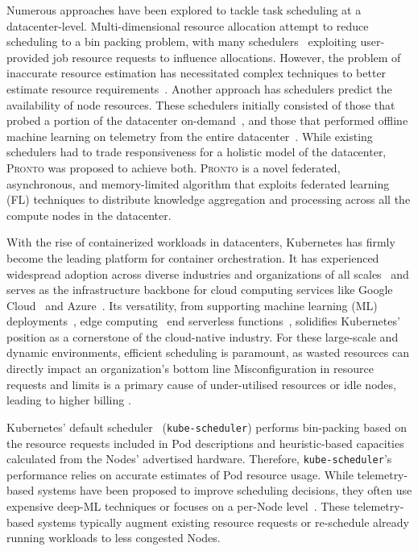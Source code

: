 Numerous approaches have been explored to tackle task scheduling at a
datacenter-level. Multi-dimensional resource allocation attempt to reduce
scheduling to a bin packing problem, with many schedulers~\cite{verma2015large,
ungureanu2019kubernetes}
exploiting user-provided job resource requests to influence allocations.
However, the problem of inaccurate resource estimation has necessitated complex
techniques to better estimate resource requirements~\cite{delimitrou2014quasar, grandl2016altruistic, venkataraman2016ernest}. Another approach
has schedulers predict the availability of node resources. These schedulers
initially consisted of those that probed a portion of the datacenter
on-demand~\cite{ousterhout2013sparrow}, and those that performed offline machine learning on
telemetry from the entire datacenter~\cite{cortez2017resource}. While existing schedulers had to
trade responsiveness for a holistic model of the datacenter, \textsc{Pronto} was
proposed to achieve both. \textsc{Pronto} is a novel federated, asynchronous,
and memory-limited algorithm that exploits federated learning (FL) techniques to
distribute knowledge aggregation and processing across all the compute nodes in
the datacenter.

With the rise of containerized workloads in datacenters, Kubernetes has firmly
become the leading platform for container orchestration. It has experienced
widespread adoption across diverse industries and organizations of all
scales~\cite{kubernetes-adoption-statistics} and serves as the infrastructure
backbone for cloud computing services like Google Cloud~\cite{google-gke} and
Azure~\cite{azure-aks}. Its versatility, from supporting machine learning (ML)
deployments~\cite{kubernetes-ai}, edge computing~\cite{cloudraft} end serverless
functions~\cite{knative, openwhisk}, solidifies Kubernetes' position as a
cornerstone of the cloud-native industry. For these large-scale and dynamic
environments, efficient scheduling is paramount, as wasted resources can
directly impact an organization's bottom line Misconfiguration in resource
requests and limits is a primary cause of under-utilised resources or idle
nodes, leading to higher billing \cite{cost-strategies,
bin-packing-and-cost-savings-in-kubernetes-clusters-on-aws}.

Kubernetes' default scheduler~\cite{kube-scheduler} (\texttt{kube-scheduler})
performs bin-packing based on the resource requests included in Pod descriptions
and heuristic-based capacities calculated from the Nodes' advertised hardware.
Therefore, \texttt{kube-scheduler}'s performance relies on accurate estimates
of Pod resource usage. While telemetry-based systems have been proposed to
improve scheduling decisions, they often use expensive deep-ML techniques
\cite{bao2019deep, peng2021dl2} or focuses on a per-Node
level~\cite{yang2019design}. These telemetry-based systems typically augment
existing resource requests or re-schedule already running workloads to less
congested Nodes.

